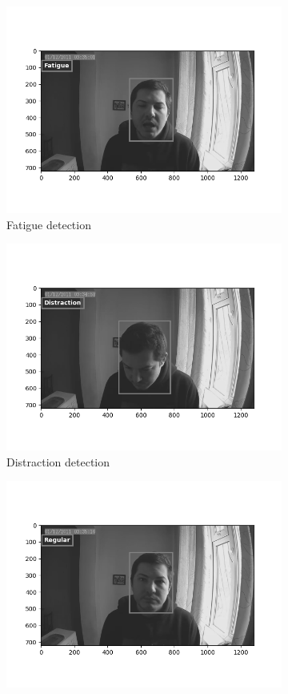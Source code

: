     \begin{figure}[ht!]
        \begin{subfigure}{.3\textwidth}
          \centering
          \includegraphics[width=.8\linewidth]{graphics/fatigue.png}
          \caption{Fatigue detection}
          \label{fig:sfig1}
        \end{subfigure}%
        \begin{subfigure}{.3\textwidth}
          \centering
          \includegraphics[width=.8\linewidth]{graphics/distraction.png}
          \caption{Distraction detection}
          \label{fig:sfig2}
        \end{subfigure}
        \begin{subfigure}{.3\textwidth}
            \centering
            \includegraphics[width=.8\linewidth]{graphics/regular.png}

\end{subfigure}
\end{figure}
